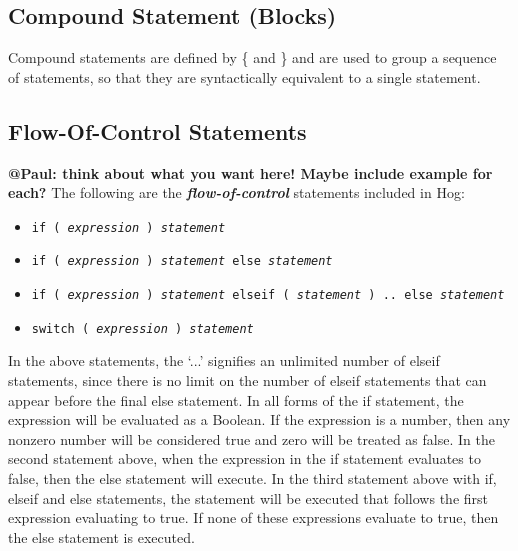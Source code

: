 \documentclass{article}
\begin{document}

\subsection{Compound Statement (Blocks)} %
\label{sub:compound_statement}

Compound statements are defined by \{ and \} and are used to group a sequence of
statements, so that they are syntactically equivalent to a single statement.


\subsection{Flow-Of-Control Statements} %
\label{sub:flow_of_control_statements}

\textbf{@Paul: think about what you want here! Maybe include example for each?} The
following are the \textbf{\emph{flow-of-control}} statements included in Hog:

\begin{itemize}
  \item[] \tt if ( \rm \emph{expression} \tt ) \rm \emph{statement}
  \item[] \tt if ( \rm \emph{expression} \tt ) \rm \emph{statement} \tt else \rm \emph{statement}
  \item[] \tt if ( \rm \emph{expression} \tt ) \rm \emph{statement} \tt elseif ( \rm \emph{statement} \tt ) .. else 
  \rm \emph{statement}
  \item[] \tt switch ( \rm \emph{expression} \tt ) \rm \emph{statement} \rm
\end{itemize}

In the above statements, the ‘...’ signifies an unlimited number of elseif
statements, since there is no limit on the number of elseif statements that can
appear before the final else statement. In all forms of the if statement, the
expression will be evaluated as a Boolean. If the expression is a number, then any
non­zero number will be considered true and zero will be treated as false. In the
second statement above, when the expression in the if statement evaluates to false,
then the else statement will execute. In the third statement above with if, elseif
and else statements, the statement will be executed that follows the first
expression evaluating to true. If none of these expressions evaluate to true, then
the else statement is executed.
\end{document}
